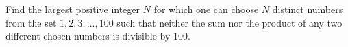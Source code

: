 Find the largest positive integer $N $ for which one can choose $N $ distinct numbers from the set ${1,2,3,...,100}$ such that neither the sum nor the product of any two different chosen numbers is divisible by $100$.
